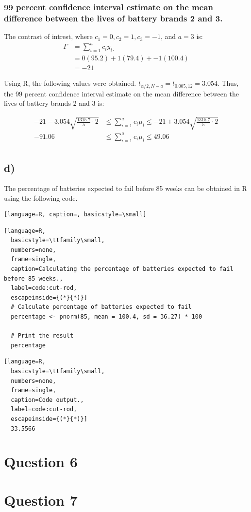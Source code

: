 \documentclass{article}
\begin{document}
\subsubsection*{99 percent confidence interval estimate on the mean difference between the lives of battery brands 2 and 3.}
The contrast of intrest, where $c_1 = 0, c_2 = 1, c_3 = -1$, and $a = 3$ is:
\begin{align*}
    \Gamma &=  \sum_{i=1}^{a} c_i \bar{y}_{i \cdot} \\
                &= 0(95.2) + 1(79.4) + -1(100.4) \\
                &= -21 
    \end{align*}
\begin{flushleft}
    Using R, the following values were obtained. $t_{\alpha/2,N-a} = t_{0.005,12} = 3.054$.
    Thus, the 99 percent confidence interval estimate on the mean difference between the lives of battery brands 2 and 3 is:
\end{flushleft}
\begin{align*}
    -21 - 3.054 \sqrt{\frac{1315.7}{5} \cdot 2}
    &\leq \sum_{i=1}^{a} c_i \mu_i \leq
    -21 + 3.054 \sqrt{\frac{1315.7}{5} \cdot 2} \\
    -91.06
    &\leq \sum_{i=1}^{a} c_i \mu_i \leq
    49.06 \\
\end{align*}
\subsection*{d)}
The percentage of batteries expected to fail before 85 weeks can be obtained in R using the following code.
\begin{lstlisting}[language=R, caption=, basicstyle=\small]

\end{lstlisting}
\begin{lstlisting}[language=R, 
  basicstyle=\ttfamily\small,
  numbers=none, 
  frame=single, 
  caption=Calculating the percentage of batteries expected to fail before 85 weeks.,
  label=code:cut-rod,
  escapeinside={(*}{*)}]
  # Calculate percentage of batteries expected to fail
  percentage <- pnorm(85, mean = 100.4, sd = 36.27) * 100
  
  # Print the result
  percentage
\end{lstlisting}
\begin{lstlisting}[language=R, 
  basicstyle=\ttfamily\small,
  numbers=none, 
  frame=single, 
  caption=Code output.,
  label=code:cut-rod,
  escapeinside={(*}{*)}]
  33.5566
\end{lstlisting}


\clearpage
\section*{Question 6}

\clearpage
\section*{Question 7}
\end{document}
